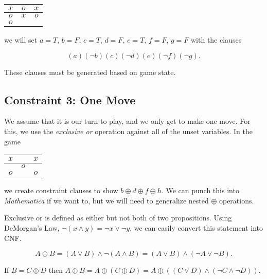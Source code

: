 \documentclass[12pt]{article}
\newcommand{\tictactoe}[9]{\begin{center}\begin{tabular}{ c | c | c }{$#1$} & {$#2$} & {$#3$} \\ \hline {$#4$} & {$#5$} & {$#6$} \\ \hline {$#7$} & {$#8$} & {$#9$} \end{tabular}\end{center}}
\begin{document}
\tictactoe{x}{o}{x}{o}{x}{o}{o}{}{}

we will set $a=T$, $b=F$, $c=T$, $d=F$, $e=T$, $f=F$, $g=F$ with the clauses

\begin{equation}(a)(\neg b)(c)(\neg d)(e)(\neg f)(\neg g).\end{equation}

These clauses must be generated based on game state.

\subsection{Constraint 3: One Move}

We assume that it is our turn to play, and we only get to make one move.
For this, we use the \textit{exclusive or} operation against all of the unset variables.
In the game

\tictactoe{x}{}{x}{}{o}{}{o}{}{o}

we create constraint clauses to show $b \oplus d \oplus f \oplus h$.
We can punch this into \textit{Mathematica} if we want to, but we will need to generalize nested $\oplus$ operations.

Exclusive or is defined as either but not both of two propositions. Using DeMorgan's Law, $\neg (x \wedge y) = \neg x \vee \neg y$, we can easily convert this statement into CNF.

\begin{equation}A \oplus B = (A \vee B) \wedge \neg (A \wedge B) = (A \vee B) \wedge (\neg A \vee \neg B).\end{equation}

If $B = C \oplus D$ then $A \oplus B = A \oplus (C \oplus D) = A \oplus ((C \vee D) \wedge (\neg C \wedge \neg D))$. 
\end{document}
